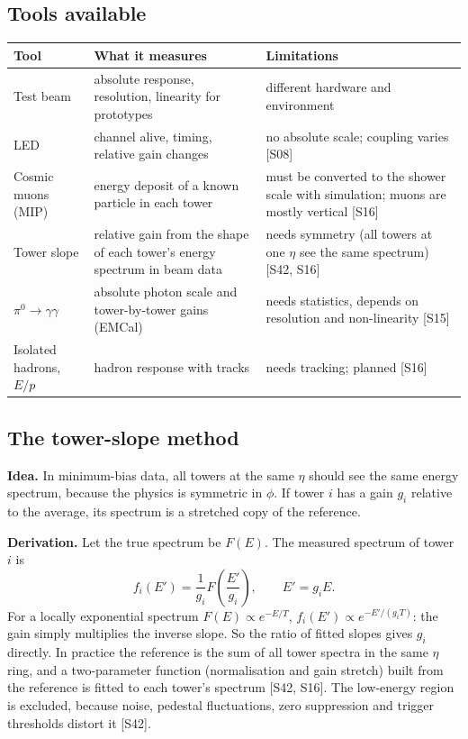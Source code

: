 \documentclass[11pt,letterpaper]{article}
\begin{document}
\subsection{Tools available}
\begin{center}\small
\begin{tabularx}{\linewidth}{@{}lXX@{}}\toprule
Tool & What it measures & Limitations\\\midrule
Test beam & absolute response, resolution, linearity for prototypes & different hardware and environment\\
LED & channel alive, timing, relative gain changes & no absolute scale; coupling varies [S08]\\
Cosmic muons (MIP) & energy deposit of a known particle in each tower & must be converted to the shower scale with simulation; muons are mostly vertical [S16]\\
Tower slope & relative gain from the shape of each tower's energy spectrum in beam data & needs symmetry (all towers at one $\eta$ see the same spectrum) [S42, S16]\\
$\pi^0\to\gamma\gamma$ & absolute photon scale and tower-by-tower gains (EMCal) & needs statistics, depends on resolution and non-linearity [S15]\\
Isolated hadrons, $E/p$ & hadron response with tracks & needs tracking; planned [S16]\\\bottomrule
\end{tabularx}\end{center}

\subsection{The tower-slope method}
\textbf{Idea.} In minimum-bias data, all towers at the same $\eta$ should see the same energy spectrum, because the physics is symmetric in $\phi$.
If tower $i$ has a gain $g_i$ relative to the average, its spectrum is a stretched copy of the reference.

\textbf{Derivation.} Let the true spectrum be $F(E)$. The measured spectrum of tower $i$ is
\begin{equation}
f_i(E')=\frac{1}{g_i}F\!\left(\frac{E'}{g_i}\right),\qquad E'=g_iE .
\end{equation}
For a locally exponential spectrum $F(E)\propto e^{-E/T}$, $f_i(E')\propto e^{-E'/(g_iT)}$: the gain simply multiplies the inverse slope.
So the ratio of fitted slopes gives $g_i$ directly.
In practice the reference is the sum of all tower spectra in the same $\eta$ ring, and a two-parameter function (normalisation and gain stretch) built from the reference is fitted to each tower's spectrum [S42, S16].
The low-energy region is excluded, because noise, pedestal fluctuations, zero suppression and trigger thresholds distort it [S42].
\end{document}
